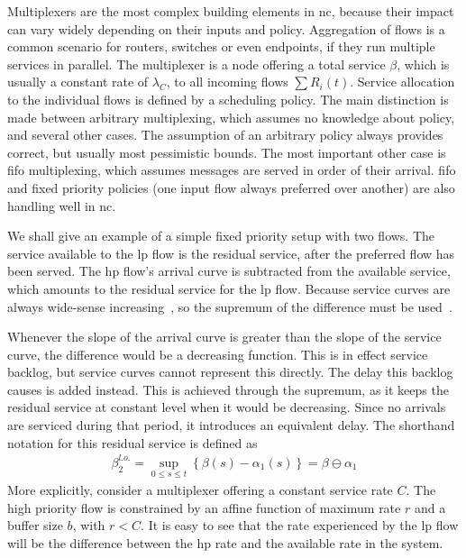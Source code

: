 Multiplexers are the most complex building elements in \gls{nc}, because their impact can vary widely depending on their inputs and policy.
Aggregation of flows is a common scenario for routers, switches or even endpoints, if they run multiple services in parallel.
The multiplexer is a node offering a total service $\beta$, which is usually a constant rate of  $\lambda_C$, to all incoming flows $\sum R_i(t)$. 
Service allocation to the individual flows is defined by a scheduling policy. The main distinction is made between arbitrary multiplexing, which assumes
no knowledge about policy, and several other cases. The assumption of an arbitrary policy always provides correct, but usually most pessimistic bounds. 
The most important other case is \gls{fifo} multiplexing, which assumes messages are served in order of their arrival.
\gls{fifo} and fixed priority policies (one input flow always preferred over another) are also handling well in \gls{nc}.  
\par
We shall give an example of a simple fixed priority setup with two flows.
The service available to the \gls{lp} flow is the residual service, after the preferred flow has been served. 
The \gls{hp} flow's arrival curve is subtracted from the available service, which amounts to the residual service for the \gls{lp} flow. 
Because service curves are always wide-sense increasing~\cite[p. 19]{thiran_network_2001}, so the supremum of the difference must be used~\cite{schmitt_comprehensive_2007}.
\par
Whenever the slope of the arrival curve is greater than the slope of the service curve, the difference would be a decreasing function. This is in effect service backlog,
but service curves cannot represent this directly. The delay this backlog causes is added instead.
This is achieved through the supremum, as it keeps the residual service at constant level when it would be decreasing. Since no arrivals are serviced during that period, it introduces an equivalent delay.
The shorthand notation for this residual service is defined as
%
\begin{align}
\beta^{l.o.}_2 = \sup_{0 \le s \le t}\left\{\beta(s) - \alpha_1(s)\right\} = \beta \ominus \alpha_1
\label{eq:nc_res_serv0}
\end{align}
%
More explicitly, consider a multiplexer offering a constant service rate $C$. The high priority flow is constrained by an affine function of maximum rate $r$ and a buffer size $b$, with $r < C$.
It is easy to see that the rate experienced by the \gls{lp} flow will be the difference between the \gls{hp} rate and the available rate in the system.
